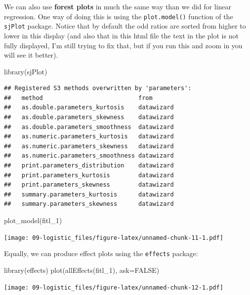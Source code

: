\documentclass[
]{book}
\newenvironment{Shaded}{\begin{snugshade}}{\end{snugshade}}
\newcommand{\AttributeTok}[1]{\textcolor[rgb]{0.77,0.63,0.00}{#1}}
\newcommand{\ConstantTok}[1]{\textcolor[rgb]{0.00,0.00,0.00}{#1}}
\newcommand{\FunctionTok}[1]{\textcolor[rgb]{0.00,0.00,0.00}{#1}}
\newcommand{\NormalTok}[1]{#1}
\begin{document}
We can also use \textbf{forest plots} in much the same way than we did for linear regression. One way of doing this is using the \texttt{plot.model()} function of the \texttt{sjPlot} package. Notice that by default the odd ratios are sorted from higher to lower in this display (and also that in this html file the text in the plot is not fully displayed, I'm still trying to fix that, but if you run this and zoom in you will see it better).

\begin{Shaded}
\begin{Highlighting}[]
\FunctionTok{library}\NormalTok{(sjPlot)}
\end{Highlighting}
\end{Shaded}

\begin{verbatim}
## Registered S3 methods overwritten by 'parameters':
##   method                           from      
##   as.double.parameters_kurtosis    datawizard
##   as.double.parameters_skewness    datawizard
##   as.double.parameters_smoothness  datawizard
##   as.numeric.parameters_kurtosis   datawizard
##   as.numeric.parameters_skewness   datawizard
##   as.numeric.parameters_smoothness datawizard
##   print.parameters_distribution    datawizard
##   print.parameters_kurtosis        datawizard
##   print.parameters_skewness        datawizard
##   summary.parameters_kurtosis      datawizard
##   summary.parameters_skewness      datawizard
\end{verbatim}

\begin{Shaded}
\begin{Highlighting}[]
\FunctionTok{plot\_model}\NormalTok{(fitl\_1)}
\end{Highlighting}
\end{Shaded}

\texttt{[image: 09-logistic\_files/figure-latex/unnamed-chunk-11-1.pdf]}

Equally, we can produce effect plots using the \texttt{effects} package:

\begin{Shaded}
\begin{Highlighting}[]
\FunctionTok{library}\NormalTok{(effects)}
\FunctionTok{plot}\NormalTok{(}\FunctionTok{allEffects}\NormalTok{(fitl\_1), }\AttributeTok{ask=}\ConstantTok{FALSE}\NormalTok{)}
\end{Highlighting}
\end{Shaded}

\texttt{[image: 09-logistic\_files/figure-latex/unnamed-chunk-12-1.pdf]}
\end{document}
